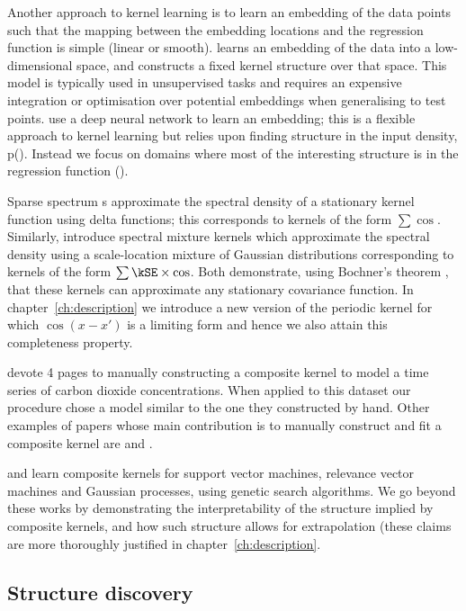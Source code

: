 Another approach to kernel learning is to learn an embedding of the data points such that the mapping between the embedding locations and the regression function is simple (\eg linear or smooth).
\citet{Lawrence2005-cn} learns an embedding of the data into a low-dimensional space, and constructs a fixed kernel structure over that space.
This model is typically used in unsupervised tasks and requires an expensive integration or optimisation over potential embeddings when generalising to test points.
\citet{Salakhutdinov2008-zt} use a deep neural network to learn an embedding; this is a flexible approach to kernel learning but relies upon finding structure in the input density, p().
Instead we focus on domains where most of the interesting structure is in the regression function \function().

Sparse spectrum \gp{}s \citep{Lazaro-gredilla2010-hc} approximate the spectral density of a stationary kernel function using delta functions; this corresponds to kernels of the form $\sum \cos$.
Similarly, \citet{Wilson2013-eq} introduce spectral mixture kernels which approximate the spectral density using a scale-location mixture of Gaussian distributions corresponding to kernels of the form $\sum \kSE \times \cos$.
Both demonstrate, using Bochner's theorem \citep{Bochner1959-yk}, that these kernels can approximate any stationary covariance function.
In chapter~\ref{ch:description} we introduce a new version of the periodic kernel for which $\cos(x-x')$ is a limiting form and hence we also attain this completeness property.

\cite{Rasmussen2006-ml} devote 4 pages to manually constructing a composite kernel to model a time series of carbon dioxide concentrations.
When applied to this dataset our procedure chose a model similar to the one they constructed by hand.
Other examples of papers whose main contribution is to manually construct and fit a composite \gp{} kernel are \cite{Klenske_undated-ys} and \cite{Lloyd2013-yn}.

\citet{Diosan2007-un, Bing2010-of} and \citet{Kronberger_undated-vf} learn composite kernels for support vector machines, relevance vector machines and Gaussian processes, using genetic search algorithms.
We go beyond these works by demonstrating the interpretability of the structure implied by composite kernels, and how such structure allows for extrapolation (these claims are more thoroughly justified in chapter~\ref{ch:description}.

\subsection{Structure discovery}

